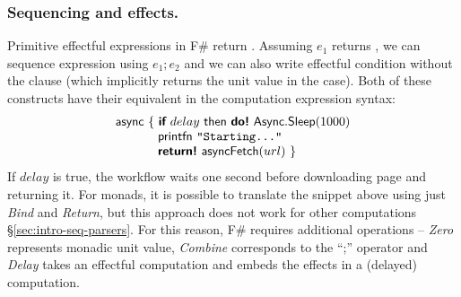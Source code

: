 \documentclass[runningheads,a4paper]{llncs}
\begin{document}
\vspace{-1em}
\subsubsection{Sequencing and effects.} Primitive effectful expressions in F\# return .
Assuming $e_1$ returns , we can sequence expression using $e_1; e_2$ and we can also
write effectful  condition without the  clause (which implicitly returns
the unit value in the  case). Both of these constructs have their equivalent 
in the computation expression syntax:
%
\begin{equation*}
\begin{array}{l}
\textnormal{\sffamily async}~\{~ \textnormal{\bfseries\sffamily if}~delay~\textnormal{\sffamily then}~\textnormal{\bfseries\sffamily do!}~\textnormal{\sffamily Async}.\textnormal{\sffamily Sleep}(1000)\\
\hspace{3.4em}     \textnormal{\sffamily printfn}~ \texttt{"Starting..."}\\
\hspace{3.4em}     \textnormal{\bfseries\sffamily return!}~ \textnormal{\sffamily asyncFetch}(url) ~\}
\end{array}
\end{equation*}
%
If $delay$ is true, the workflow waits one second before downloading page and returning it.
For monads, it is possible to translate the snippet above using just \emph{Bind} and \emph{Return}, 
but this approach does not work for other computations \S\ref{sec:intro-seq-parsers}. For this reason, 
F\# requires additional operations -- \emph{Zero} represents monadic unit value, \emph{Combine} 
corresponds to the ``;'' operator and \emph{Delay} takes an effectful computation and embeds the 
effects in a (delayed) computation. 
\end{document}
